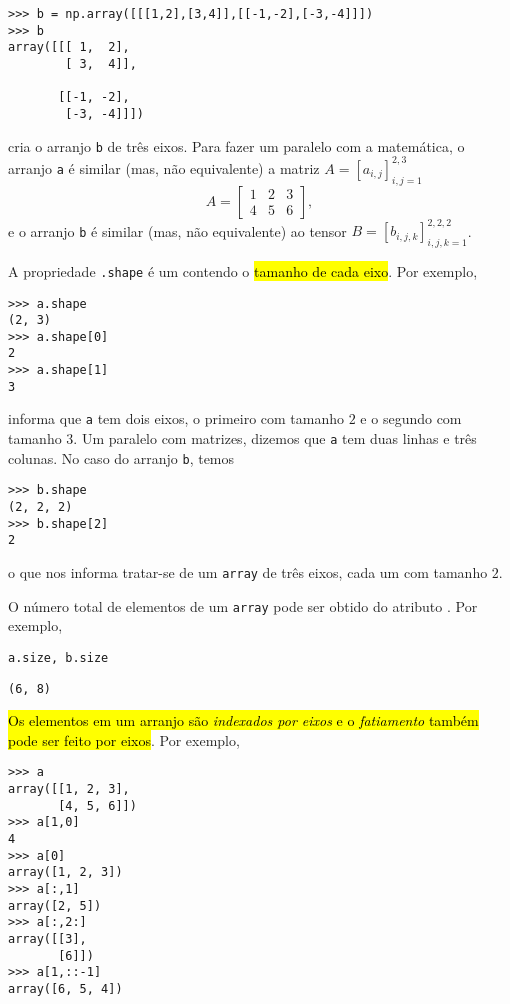 \begin{lstlisting}
>>> b = np.array([[[1,2],[3,4]],[[-1,-2],[-3,-4]]])
>>> b
array([[[ 1,  2],
        [ 3,  4]],

       [[-1, -2],
        [-3, -4]]])
\end{lstlisting}

cria o arranjo \lstinline+b+ de três eixos. Para fazer um paralelo com a matemática, o arranjo \lstinline+a+ é similar (mas, não equivalente) a matriz $A = [a_{i,j}]_{i,j=1}^{2,3}$
\begin{equation}
  A =
  \begin{bmatrix}
    1 & 2 & 3\\
    4 & 5 & 6
  \end{bmatrix},
\end{equation}
e o arranjo \lstinline+b+ é similar (mas, não equivalente) ao tensor $B = [b_{i,j,k}]_{i,j,k=1}^{2,2,2}$.

A propriedade \lstinline+.shape+ é um {\PYTHONtuple} contendo o \hl{tamanho de cada eixo}. Por exemplo,

\begin{lstlisting}
>>> a.shape
(2, 3)
>>> a.shape[0]
2
>>> a.shape[1]
3
\end{lstlisting}

informa que \lstinline+a+ tem dois eixos, o primeiro com tamanho $2$ e o segundo com tamanho $3$. Um paralelo com matrizes, dizemos que \lstinline+a+ tem duas linhas e três colunas. No caso do arranjo \lstinline+b+, temos

\begin{lstlisting}
>>> b.shape
(2, 2, 2)
>>> b.shape[2]
2
\end{lstlisting}

o que nos informa tratar-se de um \lstinline+array+ de três eixos, cada um com tamanho $2$.

O número total de elementos de um \lstinline+array+ pode ser obtido do atributo {\PYTHONnumpyDOTndarrayDOTsize}. Por exemplo,

\begin{lstlisting}
a.size, b.size
\end{lstlisting}

\begin{verbatim}
(6, 8)
\end{verbatim}

\hl{Os elementos em um arranjo são \emph{indexados por eixos} e o \emph{fatiamento} também pode ser feito por eixos}. Por exemplo,

\begin{lstlisting}
>>> a
array([[1, 2, 3],
       [4, 5, 6]])
>>> a[1,0]
4
>>> a[0]
array([1, 2, 3])
>>> a[:,1]
array([2, 5])
>>> a[:,2:]
array([[3],
       [6]])
>>> a[1,::-1]
array([6, 5, 4])
\end{lstlisting}

